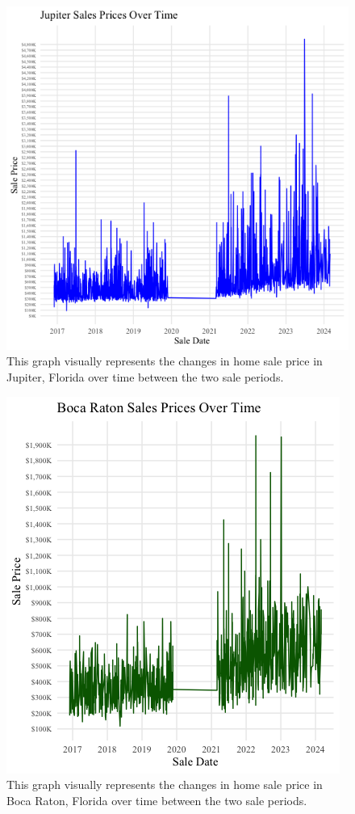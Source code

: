 \documentclass[12pt,english]{article}
\begin{document}

\begin{figure}[H]
\centering
\includegraphics[width=1\linewidth]{jupsalesOT.png}
\caption{This graph visually represents the changes in home sale price in Jupiter, Florida over time between the two sale periods.}
\label{fig:fig1}
\end{figure}


\begin{figure}[H]
\centering
\bigskip
\includegraphics[width=.9\linewidth]{bocasalesOT.png}
\caption{This graph visually represents the changes in home sale price in Boca Raton, Florida over time between the two sale periods.}
\label{fig:fig2}
\end{figure}
\end{document}
